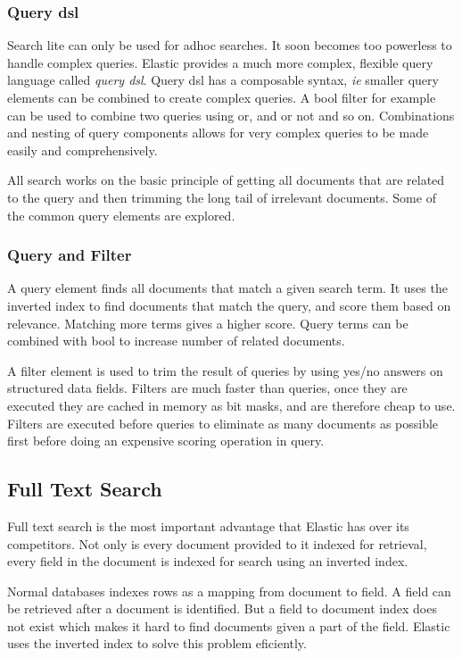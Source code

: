 \documentclass[12pt]{article}
\begin{document}
			\subsubsection{Query \ac{dsl}}
				Search lite can only be used for adhoc searches. It soon becomes too powerless to handle complex queries. Elastic provides a much more complex, flexible query language called \emph{query \ac{dsl}}. Query \ac{dsl} has a composable syntax, \emph{ie} smaller query elements can be combined to create complex queries. A bool filter for example can be used to combine two queries using or, and or not and so on. Combinations and nesting of query components allows for very complex queries to be made easily and comprehensively.

				All search works on the basic principle of getting all documents that are related to the query and then trimming the long tail of irrelevant documents. Some of the common query elements are explored.

			\subsubsection{Query and Filter}
				A query element finds all documents that match a given search term. It uses the inverted index to find documents that match the query, and score them based on relevance. Matching more terms gives a higher score. Query terms can be combined with bool to increase number of related documents.

				A filter element is used to trim the result of queries by using yes/no answers on structured data fields. Filters are much faster than queries, once they are executed they are cached in memory as bit masks, and are therefore cheap to use. Filters are executed before queries to eliminate as many documents as possible first before doing an expensive scoring operation in query. 

		\subsection{Full Text Search}
			Full text search is the most important advantage that Elastic has over its competitors. Not only is every document provided to it indexed for retrieval, every field in the document is indexed for search using an inverted index.

			Normal databases indexes rows as a mapping from document to field. A field can be retrieved after a document is identified. But a field to document index does not exist which makes it hard to find documents given a part of the field. Elastic uses the inverted index to solve this problem eficiently.
\end{document}
